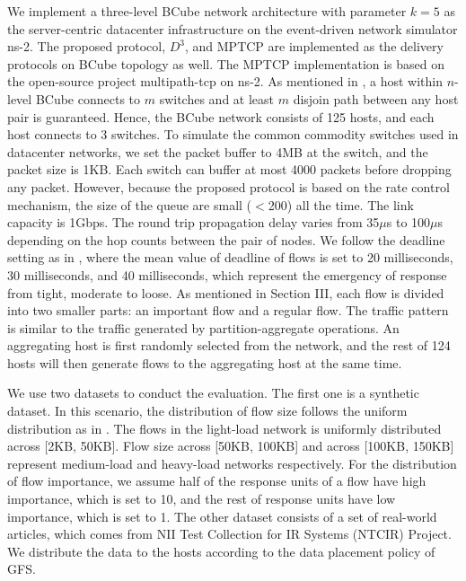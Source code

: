 \documentclass[conference]{IEEEtran}
\begin{document}
We implement a three-level BCube network architecture\cite{bcube} with parameter $k=5$ as the server-centric datacenter infrastructure on the event-driven network simulator ns-2\cite{ns2}. The proposed protocol, $D^{3}$\cite{deadline}, and MPTCP\cite{mptcp} are implemented as the delivery protocols on BCube topology as well. The MPTCP implementation is based on the open-source project multipath-tcp on ns-2\cite{mptcpns2}. As mentioned in \cite{bcube}, a host within $n$-level BCube connects to $m$ switches and at least $m$ disjoin path between any host pair is guaranteed. Hence, the BCube network consists of 125 hosts, and each host connects to 3 switches. To simulate the common commodity switches used in datacenter networks, we set the packet buffer to 4MB at the switch, and the packet size is 1KB. Each switch can buffer at most 4000 packets before dropping any packet. However, because the proposed protocol is based on the rate control mechanism, the size of the queue are small ($<$200) all the time. The link capacity is 1Gbps. The round trip propagation delay varies from 35$\mu$s to 100$\mu$s depending on the hop counts between the pair of nodes. We follow the deadline setting as in \cite{deadline}, where the mean value of deadline of flows is set to 20 milliseconds, 30 milliseconds, and 40 milliseconds, which represent the emergency of response from tight, moderate to loose. As mentioned in Section III, each flow is divided into two smaller parts: an important flow and a regular flow. The traffic pattern is similar to the traffic generated by partition-aggregate operations. An aggregating host is first randomly selected from the network, and the rest of 124 hosts will then generate flows to the aggregating host at the same time.

We use two datasets to conduct the evaluation. The first one is a synthetic dataset. In this scenario, the distribution of flow size follows the uniform distribution as in \cite{deadline}. The flows in the light-load network is uniformly distributed across [2KB, 50KB]. Flow size across [50KB, 100KB] and across [100KB, 150KB] represent medium-load and heavy-load networks respectively. For the distribution of flow importance, we assume half of the response units of a flow have high importance, which is set to 10, and the rest of response units have low importance, which is set to 1. The other dataset consists of a set of real-world articles, which comes from NII Test Collection for IR Systems (NTCIR) Project\cite{ntcir}. We distribute the data to the hosts according to the data placement policy of GFS\cite{gfs}.
\end{document}
